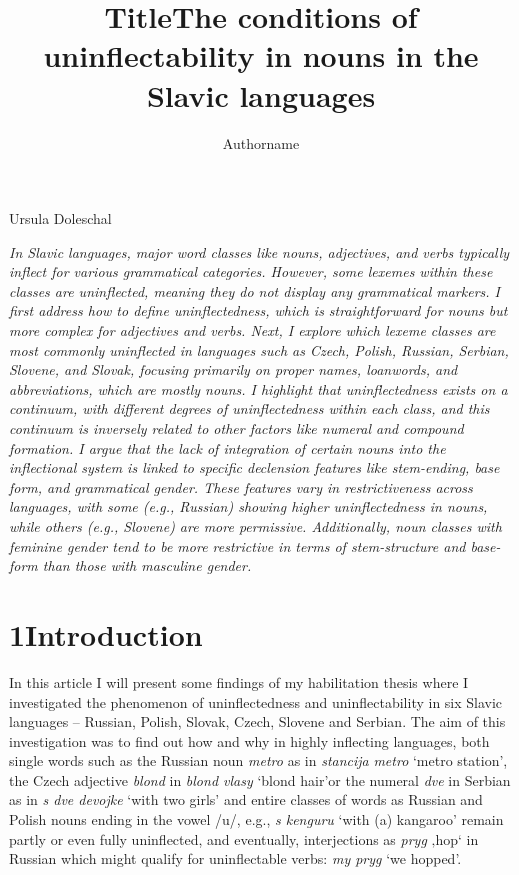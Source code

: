 \documentclass[output=paper]{langscibook}
\author{Authorname\orcid{}\affiliation{}}
\title{Title}
\begin{document}
\maketitle 

\title{The conditions of uninflectability in nouns in the Slavic languages}%

Ursula Doleschal

\textit{In Slavic languages, major word classes like nouns, adjectives, and verbs typically inflect for various grammatical categories. However, some lexemes within these classes are uninflected, meaning they do not display any grammatical markers. I first address how to define uninflectedness, which is straightforward for nouns but more complex for adjectives and verbs. Next, I explore which lexeme classes are most commonly uninflected in languages such as Czech, Polish, Russian, Serbian, Slovene, and Slovak, focusing primarily on proper names, loanwords, and abbreviations, which are mostly nouns. I highlight that uninflectedness exists on a continuum, with different degrees of uninflectedness within each class, and this continuum is inversely related to other factors like numeral and compound formation. I argue that the lack of integration of certain nouns into the inflectional system is linked to specific declension features like stem-ending, base form, and grammatical gender. These features vary in restrictiveness across languages, with some (e.g., Russian) showing higher uninflectedness in nouns, while others (e.g., Slovene) are more permissive. Additionally, noun classes with feminine gender tend to be more restrictive in terms of stem-structure and base-form than those with masculine gender.}

\section{1Introduction}

In this article I will present some findings of my habilitation thesis \citep{Doleschal2000} where I investigated the phenomenon of uninflectedness and uninflectability in six Slavic languages – Russian, Polish, Slovak, Czech, Slovene and Serbian. The aim of this investigation was to find out how and why in highly inflecting languages, both single words such as the Russian noun \textit{metro} as in \textit{stancija} \textit{metro} ‘metro station’, the Czech adjective \textit{blond} in \textit{blond vlasy} ‘blond hair’or the numeral \textit{dve} in Serbian as in \textit{s dve devojke} ‘with two girls’ and entire classes of words as Russian and Polish nouns ending in the vowel /u/, e.g., \textit{s kenguru} ‘with (a) kangaroo’ remain partly or even fully uninflected, and eventually, interjections as \textit{pryg} ‚hop‘ in Russian which might qualify for uninflectable verbs: \textit{my pryg} ‘we hopped’.
\end{document}
